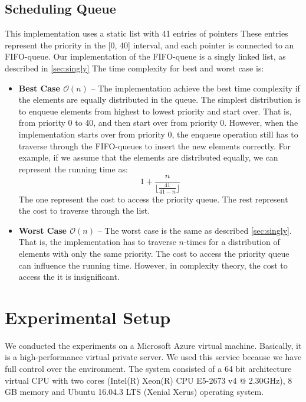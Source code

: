\documentclass[a4paper,11pt]{kth-mag}
\newcommand\floor[1]{\lfloor#1\rfloor}
\begin{document}
\subsection{Scheduling Queue}
This implementation uses a static list with 41 entries of pointers
These entries represent the priority in the [0, 40] interval, and each pointer is connected to an FIFO-queue.
Our implementation of the FIFO-queue is a singly linked list, as described in \cref{sec:singly}
The time complexity for best and worst case is:
\begin{itemize}
    \item \textbf{Best Case $\mathcal{O}(n)$} -- The implementation achieve the best time complexity if the elements are equally distributed in the queue.
        The simplest distribution is to enqueue elements from highest to lowest priority and start over.
        That is, from priority 0 to 40, and then start over from priority 0.
        However, when the implementation starts over from priority 0, the enqueue operation still has to traverse through the FIFO-queues to insert the new elements correctly.
        For example, if we assume that the elements are distributed equally, we can represent the running time as:
        \begin{equation*}
            1 + \frac{n}{\floor{\frac{41}{41-n}}}
        \end{equation*}
        The one represent the cost to access the priority queue.
        The rest represent the cost to traverse through the list.
    \item \textbf{Worst Case $\mathcal{O}(n)$} -- The worst case is the same as described \cref{sec:singly}.
        That is, the implementation has to traverse $n$-times for a distribution of elements with only the same priority.
        The cost to access the priority queue can influence the running time.
        However, in complexity theory, the cost to access the it is insignificant.
\end{itemize}



\section{Experimental Setup}
We conducted the experiments on a Microsoft Azure virtual machine.
Basically, it is a high-performance virtual private server.
We used this service because we have full control over the environment.
The system consisted of a 64 bit architecture virtual CPU with two cores (Intel(R) Xeon(R) CPU E5-2673 v4 @ 2.30GHz), 8 GB memory and Ubuntu 16.04.3 LTS (Xenial Xerus) operating system.
\end{document}
